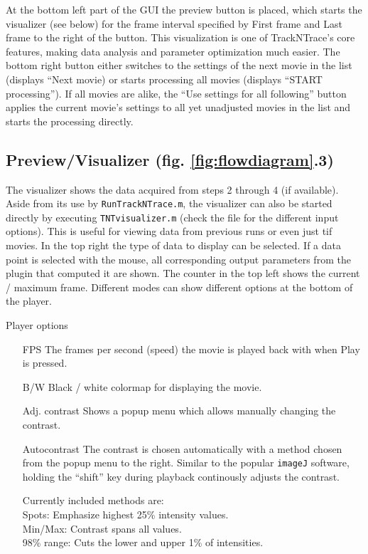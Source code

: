 \documentclass[11pt,onside]{report}
\numberwithin{equation}{chapter}
\begin{document}
At the bottom left part of the GUI the preview button is placed, which starts the visualizer (see below) for the frame interval specified by   \textsf{First frame} and \textsf{Last frame} to the right of the button. This visualization is one of TrackNTrace's core features, making data analysis and parameter optimization much easier. The bottom right button either switches to the settings of the next movie in the list (displays ``\textsf{Next movie}) or starts processing all movies (displays ``\textsf{START processing}''). If all movies are alike, the ``\textsf{Use settings for all following}'' button applies the current movie's settings to all yet unadjusted movies in the list and starts the processing directly.

\subsection*{Preview/Visualizer (fig. \ref{fig:flowdiagram}.3)}
The visualizer shows the data acquired from steps 2 through 4 (if available). Aside from its use by \texttt{RunTrackNTrace.m}, the visualizer can also be started directly by executing \texttt{TNTvisualizer.m} (check the file for the different input options). This is useful for viewing data from previous runs or even just tif movies.  In the top right the type of data to display can be selected. If a data point is selected with the mouse, all corresponding output parameters from the plugin that computed it are shown. The counter in the top left shows the current / maximum frame. Different modes can show different options at the bottom of the player.  \newline 

\textsf{Player options}
\begin{itemize}[leftmargin=3cm]
\item[FPS] The frames per second (speed) the movie is played back with when \textsf{Play} is pressed.
\item[B/W] Black / white colormap for displaying the movie.
\item[Adj. contrast] Shows a popup menu which allows manually changing the contrast.
\item[Autocontrast] The contrast is chosen automatically with a method chosen from the popup menu to the right. Similar to the popular \texttt{imageJ} software, holding the ``shift'' key during playback continously adjusts the contrast.
\item[] Currently included methods are: \\\hspace*{0.35cm}Spots: Emphasize highest 25\% intensity values.\\\hspace*{0.35cm}Min/Max: Contrast spans all values.\\\hspace*{0.35cm}98\% range: Cuts the lower and upper 1\% of intensities. 
\newline
\end{itemize} 
\end{document}
